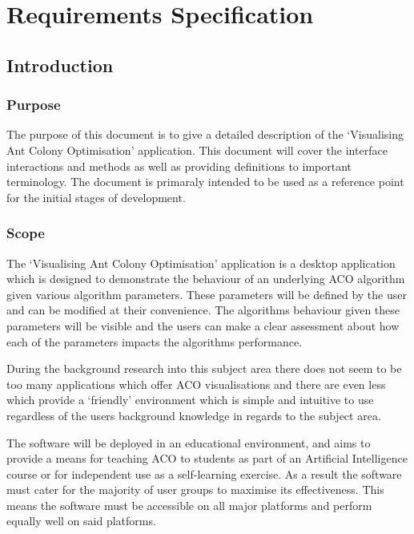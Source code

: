 
\chapter{Requirements Specification}
\renewcommand{\thechapter}{\Alph{chapter}}
\section{Introduction}

\subsection{Purpose}

The purpose of this document is to give a detailed description of the `Visualising Ant Colony Optimisation' application. This document will cover the interface interactions and methods as well as providing definitions to important terminology. The document is primaraly intended to be used as a reference point for the initial stages of development.

\subsection{Scope}

The `Visualising Ant Colony Optimisation' application is a desktop application which is designed to demonstrate the behaviour of an underlying ACO algorithm given various algorithm parameters. These parameters will be defined by the user and can be modified at their convenience. The algorithms behaviour given these parameters will be visible and the users can make a clear assessment about how each of the parameters impacts the algorithms performance.

During the background research into this subject area there does not seem to be too many applications which offer ACO visualisations and there are even less which provide a `friendly' environment which is simple and intuitive to use regardless of the users background knowledge in regards to the subject area.

The software will be deployed in an educational environment, and aims to provide a means for teaching ACO to students as part of an Artificial Intelligence course or for independent use as a self-learning exercise. As a result the software must cater for the majority of user groups to maximise its effectiveness. This means the software must be accessible on all major platforms and perform equally well on said platforms.

